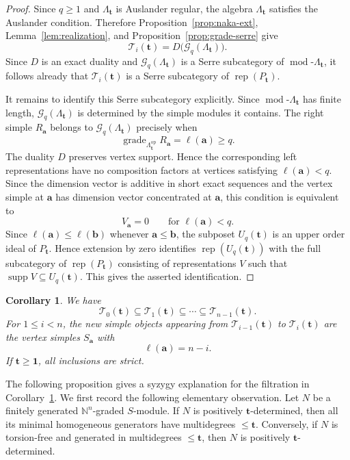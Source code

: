 \documentclass[12pt,reqno]{amsart}
\newtheorem{corollary}[theorem]{Corollary}
\theoremstyle{definition}
\theoremstyle{remark}
\newcommand{\Rep}{\operatorname{rep}}
\newcommand{\grade}{\operatorname{grade}}
\newcommand{\modcat}{\operatorname{mod}}
\begin{document}
\begin{proof}
Since $q\ge1$ and $\Lambda_{\mathbf t}$ is Auslander regular, the algebra $\Lambda_{\mathbf t}$ satisfies the Auslander condition.  Therefore Proposition~\ref{prop:naka-ext}, Lemma~\ref{lem:realization}, and Proposition~\ref{prop:grade-serre} give
\[
\mathcal T_i(\mathbf t)
=
D\bigl(\mathcal G_q(\Lambda_{\mathbf t})\bigr).
\]
Since $D$ is an exact duality and $\mathcal G_q(\Lambda_{\mathbf t})$ is a Serre subcategory of $\modcat\text{-}\Lambda_{\mathbf t}$, it follows already that $\mathcal T_i(\mathbf t)$ is a Serre subcategory of $\Rep(P_{\mathbf t})$.

It remains to identify this Serre subcategory explicitly.  Since $\modcat\text{-}\Lambda_{\mathbf t}$ has finite length, $\mathcal G_q(\Lambda_{\mathbf t})$ is determined by the simple modules it contains.  The right simple $R_{\mathbf a}$ belongs to $\mathcal G_q(\Lambda_{\mathbf t})$ precisely when
\[
\grade_{\Lambda_{\mathbf t}^{\mathrm{op}}}R_{\mathbf a}=\ell(\mathbf a)\ge q.
\]
The duality $D$ preserves vertex support.  Hence the corresponding left representations have no composition factors at vertices satisfying $\ell(\mathbf a)<q$.  Since the dimension vector is additive in short exact sequences and the vertex simple at $\mathbf a$ has dimension vector concentrated at $\mathbf a$, this condition is equivalent to
\[
V_{\mathbf a}=0\qquad\text{for }\ell(\mathbf a)<q.
\]
Since $\ell(\mathbf a)\le\ell(\mathbf b)$ whenever
$\mathbf a\le\mathbf b$, the subposet $U_q(\mathbf t)$ is an upper order
ideal of $P_{\mathbf t}$.  Hence extension by zero identifies
$\Rep(U_q(\mathbf t))$ with the full subcategory of
$\Rep(P_{\mathbf t})$ consisting of representations $V$ such that
$\operatorname{supp}V\subseteq U_q(\mathbf t)$.  This gives the asserted
identification.
\end{proof}

\begin{corollary}\label{cor:finite-filtration}
We have
\[
\mathcal T_0(\mathbf t)
\subseteq\mathcal T_1(\mathbf t)
\subseteq\cdots\subseteq\mathcal T_{n-1}(\mathbf t).
\]
For $1\le i<n$, the new simple objects appearing from
$\mathcal T_{i-1}(\mathbf t)$ to $\mathcal T_i(\mathbf t)$ are the vertex
simples $S_{\mathbf a}$ with
\[
\ell(\mathbf a)=n-i.
\]
If $\mathbf t\ge\mathbf1$, all inclusions are strict.
\end{corollary}

The following proposition gives a syzygy explanation for the filtration in Corollary~\ref{cor:finite-filtration}. We first record the following elementary observation. Let $N$ be a finitely generated $\mathbb N^n$-graded $S$-module. If $N$ is positively $\mathbf t$-determined, then all its minimal homogeneous generators have multidegrees $\le \mathbf t$. Conversely, if $N$ is torsion-free and generated in multidegrees $\le \mathbf t$, then $N$ is positively $\mathbf t$-determined.
\end{document}
